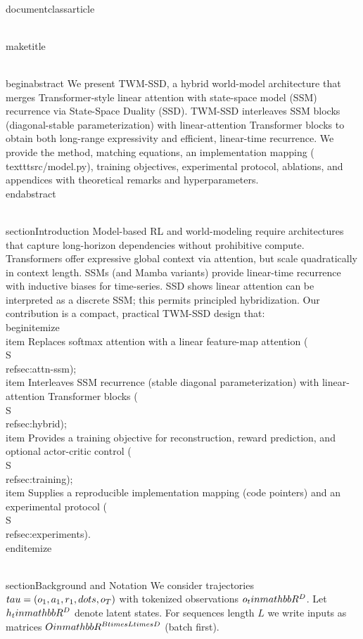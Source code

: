\\documentclass{article}
\begin{document}
\\maketitle

\\begin{abstract}
We present TWM-SSD, a hybrid world-model architecture that merges Transformer-style linear attention with state-space model (SSM) recurrence via State-Space Duality (SSD). TWM-SSD interleaves SSM blocks (diagonal-stable parameterization) with linear-attention Transformer blocks to obtain both long-range expressivity and efficient, linear-time recurrence. We provide the method, matching equations, an implementation mapping (\\texttt{src/model.py}), training objectives, experimental protocol, ablations, and appendices with theoretical remarks and hyperparameters.
\\end{abstract}

\\section{Introduction}
Model-based RL and world-modeling require architectures that capture long-horizon dependencies without prohibitive compute. Transformers offer expressive global context via attention, but scale quadratically in context length. SSMs (and Mamba variants) provide linear-time recurrence with inductive biases for time-series. SSD shows linear attention can be interpreted as a discrete SSM; this permits principled hybridization. Our contribution is a compact, practical TWM-SSD design that:
\\begin{itemize}
  \\item Replaces softmax attention with a linear feature-map attention (\\S\\ref{sec:attn-ssm});
  \\item Interleaves SSM recurrence (stable diagonal parameterization) with linear-attention Transformer blocks (\\S\\ref{sec:hybrid});
  \\item Provides a training objective for reconstruction, reward prediction, and optional actor-critic control (\\S\\ref{sec:training});
  \\item Supplies a reproducible implementation mapping (code pointers) and an experimental protocol (\\S\\ref{sec:experiments}).
\\end{itemize}

\\section{Background and Notation}
We consider trajectories $\\tau = (o_1,a_1,r_1,\\dots,o_T)$ with tokenized observations $o_t\\in\\mathbb{R}^D$. Let $h_t\\in\\mathbb{R}^D$ denote latent states. For sequences length $L$ we write inputs as matrices $O\\in\\mathbb{R}^{B\\times L \\times D}$ (batch first).
\end{document}
